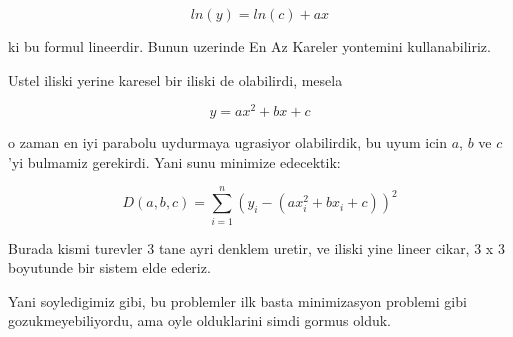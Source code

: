 \documentclass[12pt,fleqn]{article}\usepackage{../common}
\begin{document}
\[ ln(y) = ln(c) + ax \]

ki bu formul lineerdir. Bunun uzerinde En Az Kareler yontemini
kullanabiliriz. 

Ustel iliski yerine karesel bir iliski de olabilirdi, mesela

\[ y = ax^2 + bx + c \]

o zaman en iyi parabolu uydurmaya ugrasiyor olabilirdik, bu uyum icin $a$,
$b$ ve $c$'yi bulmamiz gerekirdi. Yani sunu minimize edecektik:

\[ D(a,b,c) = \sum_{i=1}^n (y_i - ( ax_i^2 + bx_i + c ))^2  \]

Burada kismi turevler 3 tane ayri denklem uretir, ve iliski yine lineer
cikar, 3 x 3 boyutunde bir sistem elde ederiz. 

Yani soyledigimiz gibi, bu problemler ilk basta minimizasyon problemi gibi
gozukmeyebiliyordu, ama oyle olduklarini simdi gormus olduk. 
\end{document}
